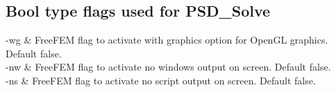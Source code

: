 \subsection{Bool type flags used for  PSD\_Solve}
\begin{conditions*} 
	-wg         &     FreeFEM flag to activate with graphics option for OpenGL graphics. Default false.  \\
	
	-nw         &     FreeFEM flag to activate no windows output on screen. Default false.  \\
	
    -ns         &     FreeFEM flag to activate no script  output on screen. Default false.  \\		
	
\end{conditions*}

